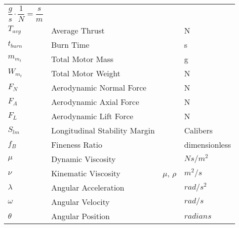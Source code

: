 \begin{longtable}[c]{@{}llll@{}}
\(\dfrac{g}{s}\cdot \dfrac{1}{N} = \dfrac{s}{m}\)\tabularnewline
\(T_{avg}\) & Average Thrust & & N\tabularnewline
\(t_{burn}\) & Burn Time & & s\tabularnewline
\(m_{m_t}\) & Total Motor Mass & & g\tabularnewline
\(W_{m_t}\) & Total Motor Weight & & N\tabularnewline
\(F_N\) & Aerodynamic Normal Force & & N\tabularnewline
\(F_A\) & Aerodynamic Axial Force & & N\tabularnewline
\(F_L\) & Aerodynamic Lift Force & & N\tabularnewline
\(S_{lm}\) & Longitudinal Stability Margin & & Calibers\tabularnewline
\(f_B\) & Fineness Ratio & & dimensionless\tabularnewline
\(\mu\) & Dynamic Viscosity & & \(N s / m^2\)\tabularnewline
\(\nu\) & Kinematic Viscosity & \(\mu\), \(\rho\) &
\(m^2/s\)\tabularnewline
\(\lambda\) & Angular Acceleration & & \(rad/s^2\)\tabularnewline
\(\omega\) & Angular Velocity & & \(rad/s\)\tabularnewline
\(\theta\) & Angular Position & & \(radians\)\tabularnewline
\bottomrule
\end{longtable}

